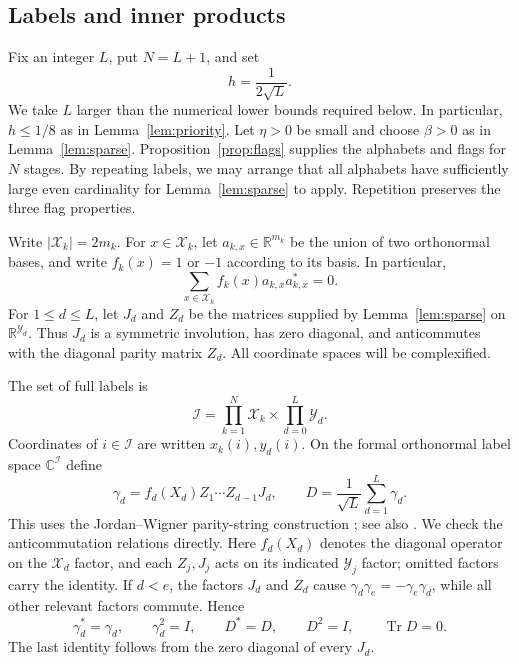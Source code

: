 \documentclass[11pt]{article}
\numberwithin{equation}{section}
\theoremstyle{definition}
\theoremstyle{remark}
\newcommand{\abs}[1]{\left\lvert#1\right\rvert}
\newcommand{\tr}{\operatorname{Tr}}
\newcommand{\cX}{\mathcal X}
\newcommand{\cY}{\mathcal Y}
\newcommand{\cI}{\mathcal I}
\begin{document}
\subsection{Labels and inner products}
Fix an integer $L$, put $N=L+1$, and set
\begin{equation}\label{eq:h}
 h=\frac1{2\sqrt L}.
\end{equation}
We take $L$ larger than the numerical lower bounds required below.
In particular, $h\le1/8$ as in Lemma~\ref{lem:priority}.
Let $\eta>0$ be small and choose $\beta>0$
as in Lemma~\ref{lem:sparse}. Proposition~\ref{prop:flags} supplies the
alphabets and flags for $N$ stages. By repeating labels, we may arrange
that all alphabets have sufficiently large even cardinality for
Lemma~\ref{lem:sparse} to apply. Repetition preserves the three flag
properties.

Write $\abs{\cX_k}=2m_k$. For $x\in\cX_k$, let
$a_{k,x}\in\mathbb R^{m_k}$ be the union of two orthonormal bases, and
write $f_k(x)=1$ or $-1$ according to its basis. In particular,
\begin{equation}\label{eq:signed-frame}
 \sum_{x\in\cX_k}f_k(x)a_{k,x}a_{k,x}^*=0.
\end{equation}
For $1\le d\le L$, let $J_d$ and $Z_d$ be the matrices supplied by
Lemma~\ref{lem:sparse} on $\mathbb R^{\cY_d}$. Thus $J_d$ is a symmetric
involution, has zero diagonal, and anticommutes with the diagonal parity
matrix $Z_d$. All coordinate spaces will be complexified.

The set of full labels is
\[
 \cI=\prod_{k=1}^N\cX_k\times\prod_{d=0}^L\cY_d.
\]
Coordinates of $i\in\cI$ are written $x_k(i),y_d(i)$. On the formal
orthonormal label space $\mathbb C^{\cI}$ define
\begin{equation}\label{eq:clifford}
 \gamma_d=f_d(X_d)Z_1\cdots Z_{d-1}J_d,
 \qquad D=\frac1{\sqrt L}\sum_{d=1}^L\gamma_d.
\end{equation}
This uses the Jordan--Wigner parity-string construction
\cite{JordanWigner}; see also \cite[Section~6]{BravyiKitaev}.
We check the anticommutation relations directly.
Here $f_d(X_d)$ denotes the diagonal operator on the $\cX_d$ factor,
and each $Z_j,J_j$ acts on its indicated $\cY_j$ factor; omitted factors
carry the identity. If $d<e$, the factors $J_d$ and $Z_d$ cause
$\gamma_d\gamma_e=-\gamma_e\gamma_d$, while all other relevant factors
commute. Hence
\begin{equation}\label{eq:D-identities}
 \gamma_d^* =\gamma_d,\qquad \gamma_d^2=I,\qquad
 D^*=D,\qquad D^2=I,\qquad \tr D=0.
\end{equation}
The last identity follows from the zero diagonal of every $J_d$.
\end{document}
